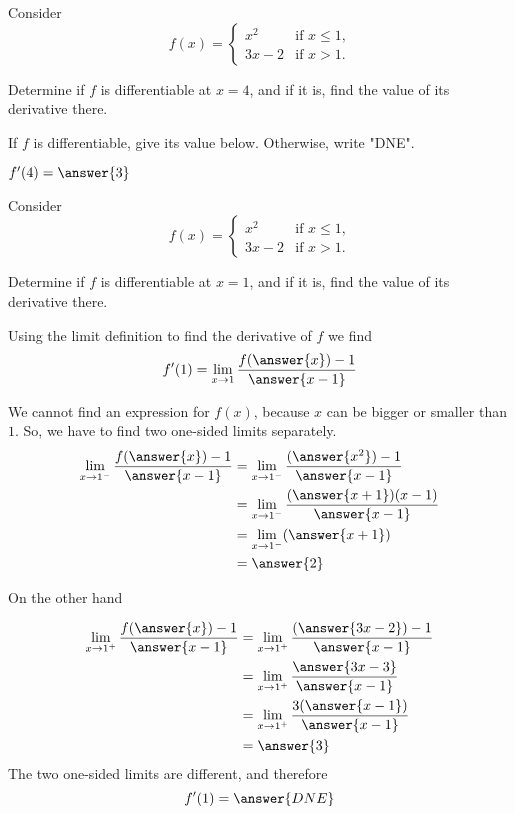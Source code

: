 \documentclass{ximera}
\author{Steven Gubkin \and Nela Lakos}
\begin{document}
\begin{exercise}

Consider 
\[
f(x) = \begin{cases} 
	x^2 &\text{if $x \leq 1$,}\\
	 3x-2 &\text{if  $x > 1$.}
\end{cases}
\]


Determine if $f$ is differentiable at $x=4$, and if it is, find the value of its derivative there.

\begin{prompt}
	If $f$ is differentiable, give its value below.  Otherwise, write "DNE".
	
	$f'(4) = \answer{3}$
\end{prompt}

\end{exercise}
\begin{exercise}

Consider 
\[
f(x) = \begin{cases} 
	x^2 &\text{if $x \leq 1$,}\\
	 3x-2 &\text{if  $x > 1$.}
\end{cases}
\]


Determine if $f$ is differentiable at $x=1$, and if it is, find the value of its derivative there.

Using the limit definition to find the derivative of $f$ we find
\[
f'(1)= \lim_{x\to1}\frac{f(\answer{x})-1}{\answer{x-1}}\\
\]

We cannot find an expression for $f(x)$, because $x$ can be bigger or smaller than $1$.
So, we have to find two one-sided limits separately.
\begin{align*}
 \lim_{x\to1^{-}}\frac{f(\answer{x})-1}{\answer{x-1}}&= \lim_{x\to1^{-}}\frac{(\answer{x^2})-1}{\answer{x-1}}\\
 &= \lim_{x\to1^{-}}\frac{(\answer{x+1})(x-1)}{\answer{x-1}}\\
  &= \lim_{x\to1^{-}}(\answer{x+1})\\
  &=\answer{2}
       \end{align*}

On the other hand


\begin{align*}
 \lim_{x\to1^{+}}\frac{f(\answer{x})-1}{\answer{x-1}}&= \lim_{x\to1^{+}}\frac{(\answer{3x-2})-1}{\answer{x-1}}\\
 &=\lim_{x\to1^{+}}\frac{\answer{3x-3}}{\answer{x-1}}\\
 &=\lim_{x\to1^{+}}\frac{3(\answer{x-1})}{\answer{x-1}}\\
  &=\answer{3}
       \end{align*}
The two one-sided limits are different, and therefore
\[
f'(1)= {\answer{DNE}}\\
\]

\end{exercise}
\end{document}
